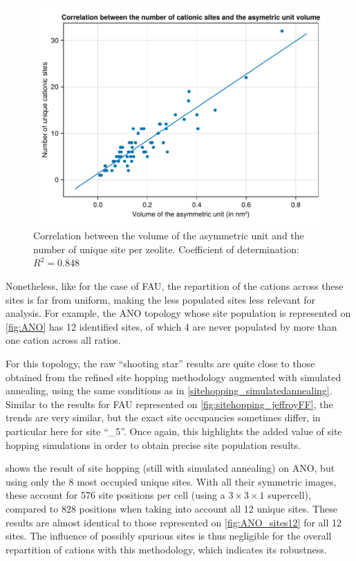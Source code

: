 \documentclass[main.tex]{subfiles}
\begin{document}
\begin{figure}
	\centering
	\includegraphics[width=0.65\linewidth]{figures/cations/sitesasymmetricvolumecell.pdf}
	\caption{Correlation between the volume of the asymmetric unit and the number of unique site per zeolite. Coefficient of determination: $R^2 = \num{0.848}$}\label{fig:sitesvolumecell}
\end{figure}

Nonetheless, like for the case of FAU, the repartition of the cations across these sites is far from uniform, making the less populated sites less relevant for analysis. For example, the ANO topology whose site population is represented on \cref{fig:ANO} has 12 identified sites, of which 4 are never populated by more than one cation across all \SiAl ratios.

For this topology, the raw ``shooting star'' results are quite close to those obtained from the refined site hopping methodology augmented with simulated annealing, using the same conditions as in \cref{sitehopping_simulatedannealing}. Similar to the results for FAU represented on \cref{fig:sitehopping_jeffroyFF}, the trends are very similar, but the exact site occupancies sometimes differ, in particular here for site ``\_5''. Once again, this highlights the added value of site hopping simulations in order to obtain precise site population results.

 shows the result of site hopping (still with simulated annealing) on ANO, but using only the 8 most occupied unique sites. With all their symmetric images, these account for 576 site positions per cell (using a $3\times3\times1$ supercell), compared to 828 positions when taking into account all 12 unique sites. These results are almost identical to those represented on \cref{fig:ANO_sites12} for all 12 sites. The influence of possibly spurious sites is thus negligible for the overall repartition of cations with this methodology, which indicates its robustness.
\end{document}
